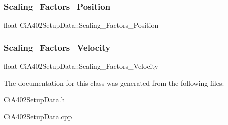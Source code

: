 \subsubsection{\texorpdfstring{Scaling\+\_\+\+Factors\+\_\+\+Position}{Scaling\_Factors\_Position}}
{\footnotesize\ttfamily float Ci\+A402\+Setup\+Data\+::\+Scaling\+\_\+\+Factors\+\_\+\+Position\hspace{0.3cm}{\ttfamily [private]}}

\mbox{\label{classCiA402SetupData_a1ac5a8bab56e6282f87684d4c7249225}} 
\subsubsection{\texorpdfstring{Scaling\+\_\+\+Factors\+\_\+\+Velocity}{Scaling\_Factors\_Velocity}}
{\footnotesize\ttfamily float Ci\+A402\+Setup\+Data\+::\+Scaling\+\_\+\+Factors\+\_\+\+Velocity\hspace{0.3cm}{\ttfamily [private]}}



The documentation for this class was generated from the following files\+:\begin{DoxyCompactItemize}
\item 
\hyperlink{CiA402SetupData_8h}{Ci\+A402\+Setup\+Data.\+h}\item 
\hyperlink{CiA402SetupData_8cpp}{Ci\+A402\+Setup\+Data.\+cpp}\end{DoxyCompactItemize}
